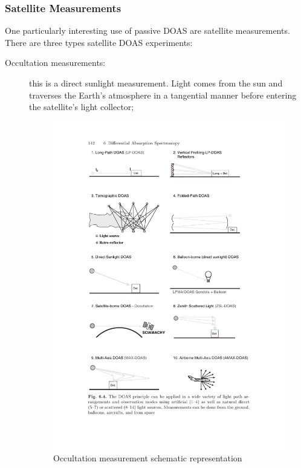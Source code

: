 \subsubsection{Satellite Measurements}%
\label{ssub:satellite_measurements}

One particularly interesting use of passive \gls{DOAS} are satellite
measurements. There are three types satellite \gls{DOAS} experiments:
\begin{description}
    \item[Occultation measurements:] this is a direct sunlight
        measurement. Light comes from the sun and traverses the Earth's
        atmosphere in a tangential manner before entering the
        satellite's light collector;

        \begin{figure}[htpb]
            \centering
            \includegraphics[trim=3cm 10cm 10.5cm
            18cm, clip, width=\textwidth]{img/pdf/zenithMaxAMax.pdf}
            \caption{Occultation measurement schematic
            representation~\cite{Platt2007}}
            \label{fig:occultation}
        \end{figure}


\end{description}
